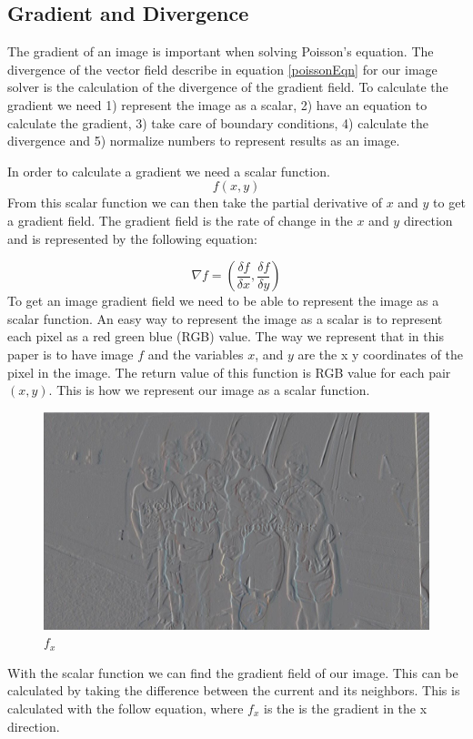 \documentclass[10pt,twopage]{acmsiggraph}
\begin{document}
\subsection{Gradient and Divergence}

The gradient of an image is important when solving Poisson's equation. The divergence of the vector field describe in equation \ref{poissonEqn} for our image solver is the calculation of the divergence of the gradient field. To calculate the gradient we need 1) represent the image as a scalar, 2) have an equation to calculate the gradient, 3) take care of boundary conditions, 4) calculate the divergence and 5) normalize numbers to represent results as an image.

In order to calculate a gradient we need a scalar function.
\begin{equation}
\ensuremath{f(x,y)}
\label{scalar}
\end{equation}
From this scalar function we can then take the partial derivative of $x$ and $y$ to get a gradient field. The gradient field is the rate of change in the $x$ and $y$ direction and is represented by the following equation:

\begin{equation}
\label{gradient}
\ensuremath{\nabla f = ( \frac{\delta f}{\delta x} , \frac{\delta f}{\delta y} )}
\end{equation}
To get an image gradient field we need to be able to represent the image as a scalar function. An easy way to represent the image as a scalar is to represent each pixel as a red green blue (RGB) value. The way we represent that in this paper is to have image $f$ and the variables $x$, and $y$ are the x y coordinates of the pixel in the image. The return value of this function is RGB value for each pair $(x,y)$. This is how we represent our image as a scalar function.

\begin{figure}
\centering
\includegraphics[width=.44\textwidth]{fig/gradientX.jpg}
\caption{\ensuremath{f_{x}}}
\label{ImageX}
\end{figure}


With the scalar function we can find the gradient field of our image. This can be calculated by taking the difference between the current and its neighbors. This is calculated with the follow equation, where \ensuremath{f_{x}} is the is the gradient in the x direction.
\end{document}
